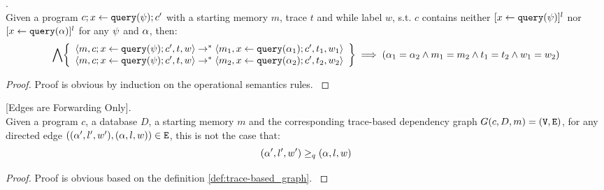 \documentclass[a4paper,11pt]{article}
\begin{document}
%
%
\begin{lem}
.
\label{lem:querysemidetrm}
\\
{
Given a program $c; \mathrel{ x \leftarrow {\tt query}(\psi) }; c'$ with a starting memory $m$, trace $t$ and while label $w$, 
s.t. $c$ contains neither  
$[\mathrel{ x \leftarrow {\tt query}(\psi) }]^l$ nor $[\mathrel{ x \leftarrow {\tt query}(\alpha) }]^l$ for any $\psi$ and $\alpha$, then:
%
\[
\bigwedge
\left\{
\begin{array}{l}
\config{m, c; \assign{x}{\query(\qexpr)}; c', t, w} 
\rightarrow^{*} 
\config{m_1, \assign{x}{\query(\qval_1)}; c', t_1, w_1} 
\\
\config{m, c; \assign{x}{\query(\qexpr)}; c', t, w} 
\rightarrow^{*} 
\config{m_2, \assign{x}{\query(\qval_2)}; c', t_2, w_2} 
\end{array}
\right\}
\implies
(\qval_1 = \qval_2 \land m_1 = m_2 \land t_1 = t_2 \land w_1 = w_2)
\]
}
\end{lem}
%
\begin{proof}
{
Proof is obvious by induction on the operational semantics rules.
}
\end{proof}
%
\begin{lem}
\label{lem:edgeforwarding}
{[Edges are Forwarding Only]}.
\\
%
{
Given a program $c$, a database $D$, a starting memory $m$ and the corresponding trace-based dependency graph $G(c,D,m) = (\mathtt{V}, \mathtt{E})$, 
for any directed edge $(({\alpha}',l',w'),({\alpha},l,w)) \in \mathtt{E}$, 
this is not the case that:
%
$$({\alpha}',l',w') \geq_{q} ({\alpha},l,w)$$
%
}
\end{lem}
%
\begin{proof}
{
Proof is obvious based on the definition \ref{def:trace-based_graph}.
}
\end{proof}
\end{document}
